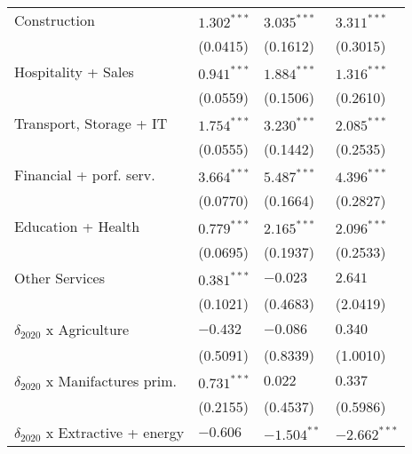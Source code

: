 \begin{tabular}{llll}
Construction                                       &      $1.302^{***}$ &      $3.035^{***}$ &      $3.311^{***}$ \\
                                                   &           (0.0415) &           (0.1612) &           (0.3015) \\
Hospitality + Sales                                &      $0.941^{***}$ &      $1.884^{***}$ &      $1.316^{***}$ \\
                                                   &           (0.0559) &           (0.1506) &           (0.2610) \\
Transport, Storage + IT                            &      $1.754^{***}$ &      $3.230^{***}$ &      $2.085^{***}$ \\
                                                   &           (0.0555) &           (0.1442) &           (0.2535) \\
Financial + porf. serv.                            &      $3.664^{***}$ &      $5.487^{***}$ &      $4.396^{***}$ \\
                                                   &           (0.0770) &           (0.1664) &           (0.2827) \\
Education + Health                                 &      $0.779^{***}$ &      $2.165^{***}$ &      $2.096^{***}$ \\
                                                   &           (0.0695) &           (0.1937) &           (0.2533) \\
Other Services                                     &      $0.381^{***}$ &           $-0.023$ &            $2.641$ \\
                                                   &           (0.1021) &           (0.4683) &           (2.0419) \\
$\delta_{2020}$ x Agriculture                      &           $-0.432$ &           $-0.086$ &            $0.340$ \\
                                                   &           (0.5091) &           (0.8339) &           (1.0010) \\
$\delta_{2020}$ x Manifactures prim.               &      $0.731^{***}$ &            $0.022$ &            $0.337$ \\
                                                   &           (0.2155) &           (0.4537) &           (0.5986) \\
$\delta_{2020}$ x Extractive + energy              &           $-0.606$ &      $-1.504^{**}$ &     $-2.662^{***}$ \\

\end{tabular}
